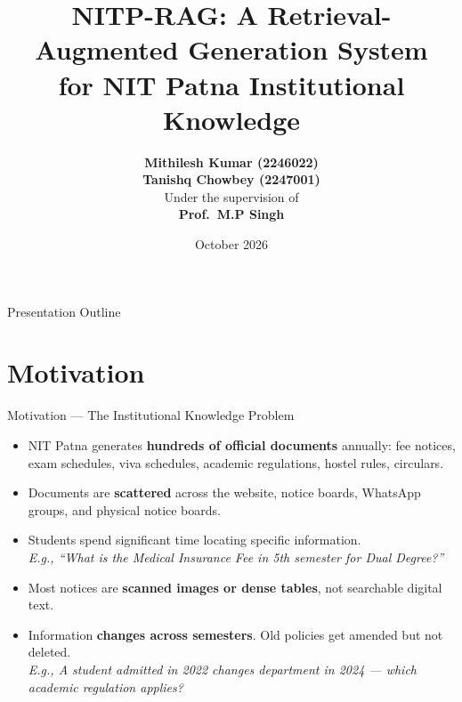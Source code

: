 \documentclass[11pt]{beamer}
\title{NITP-RAG: A Retrieval-Augmented Generation System\\for NIT Patna Institutional Knowledge}
\author{
    \large \textbf{Mithilesh Kumar (2246022)}\\[-3pt]
    \textbf{Tanishq Chowbey (2247001)}\\[4pt]
    \small Under the supervision of\\
    \textbf{Prof.\ M.P Singh}
}
\institute{\small Department of Computer Science and Engineering\\National Institute of Technology Patna}
\date{October 2026}
\begin{document}
\begin{frame}
    \titlepage
\end{frame}

\begin{frame}{Presentation Outline}
    \tableofcontents
\end{frame}

\section{Motivation}
\begin{frame}{Motivation --- The Institutional Knowledge Problem}
    \begin{itemize}
        \item NIT Patna generates \textbf{hundreds of official documents} annually: fee notices, exam schedules, viva schedules, academic regulations, hostel rules, circulars.
        \vspace{3pt}
        \item Documents are \textbf{scattered} across the website, notice boards, WhatsApp groups, and physical notice boards.
        \vspace{3pt}
        \item Students spend significant time locating specific information.\\
        \textit{E.g., ``What is the Medical Insurance Fee in 5th semester for Dual Degree?''}
        \vspace{3pt}
        \item Most notices are \textbf{scanned images or dense tables}, not searchable digital text.
        \vspace{3pt}
        \item Information \textbf{changes across semesters}. Old policies get amended but not deleted.\\
        \textit{E.g., A student admitted in 2022 changes department in 2024 --- which academic regulation applies?}
    \end{itemize}
\end{frame}
\end{document}
